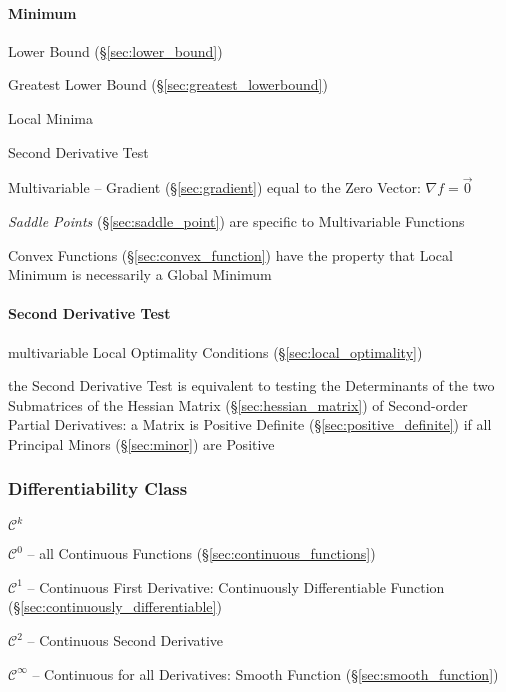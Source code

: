 \paragraph{Minimum}\label{sec:minimum}\hfill

Lower Bound (\S\ref{sec:lower_bound})

Greatest Lower Bound (\S\ref{sec:greatest_lowerbound})

Local Minima

Second Derivative Test

Multivariable -- Gradient (\S\ref{sec:gradient}) equal to the Zero Vector:
$\nabla{f} = \vec{0}$

\fist \emph{Saddle Points} (\S\ref{sec:saddle_point}) are specific to
Multivariable Functions

Convex Functions (\S\ref{sec:convex_function}) have the property that Local
Minimum is necessarily a Global Minimum



\paragraph{Second Derivative Test}\label{sec:second_derivative_test}\hfill

\fist multivariable Local Optimality Conditions (\S\ref{sec:local_optimality})

the Second Derivative Test is equivalent to testing the Determinants of the two
Submatrices of the Hessian Matrix (\S\ref{sec:hessian_matrix}) of Second-order
Partial Derivatives: a Matrix is Positive Definite
(\S\ref{sec:positive_definite}) if all Principal Minors (\S\ref{sec:minor}) are
Positive



\subsubsection{Differentiability Class}\label{sec:differentiability_class}

$\mathcal{C}^k$

$\mathcal{C}^0$ -- all Continuous Functions (\S\ref{sec:continuous_functions})

$\mathcal{C}^1$ -- Continuous First Derivative: Continuously Differentiable
Function (\S\ref{sec:continuously_differentiable})

$\mathcal{C}^2$ -- Continuous Second Derivative

$\mathcal{C}^\infty$ -- Continuous for all Derivatives: Smooth Function
(\S\ref{sec:smooth_function})



